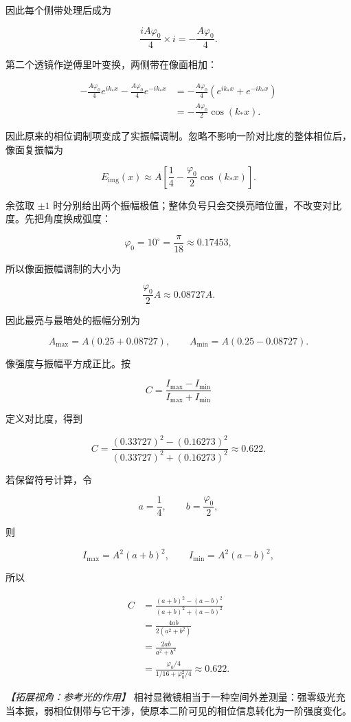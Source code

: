 \documentclass[12pt,a4paper,UTF8]{ctexart}
\begin{document}
因此每个侧带处理后成为

\[\frac{iA\varphi_0}{4}\times i
=-\frac{A\varphi_0}{4}.\]

第二个透镜作逆傅里叶变换，两侧带在像面相加：

\[\begin{aligned}
-\frac{A\varphi_0}{4}e^{ik_*x}
-\frac{A\varphi_0}{4}e^{-ik_*x}
&=-\frac{A\varphi_0}{4}
\left(e^{ik_*x}+e^{-ik_*x}\right)\\
&=-\frac{A\varphi_0}{2}\cos(k_*x).
\end{aligned}\]

因此原来的相位调制项变成了实振幅调制。忽略不影响一阶对比度的整体相位后，像面复振幅为

\[E_{\mathrm{img}}(x)
\approx A\left[\frac14-\frac{\varphi_0}{2}\cos(k_*x)\right].\]

余弦取 \(\pm1\)
时分别给出两个振幅极值；整体负号只会交换亮暗位置，不改变对比度。先把角度换成弧度：

\[\varphi_0=10^\circ=\frac\pi{18}\approx0.17453,\]

所以像面振幅调制的大小为

\[\frac{\varphi_0}{2}A\approx0.08727A.\]

因此最亮与最暗处的振幅分别为

\[A_{\max}=A(0.25+0.08727),\qquad
A_{\min}=A(0.25-0.08727).\]

像强度与振幅平方成正比。按

\[C=\frac{I_{\max}-I_{\min}}{I_{\max}+I_{\min}}\]

定义对比度，得到

\[C=
\frac{(0.33727)^2-(0.16273)^2}
{(0.33727)^2+(0.16273)^2}
\approx\boxed{0.622}.\]

若保留符号计算，令

\[a=\frac14,\qquad b=\frac{\varphi_0}{2},\]

则

\[I_{\max}=A^2(a+b)^2,\qquad
I_{\min}=A^2(a-b)^2,\]

所以

\[\begin{aligned}
C
&=\frac{(a+b)^2-(a-b)^2}{(a+b)^2+(a-b)^2}\\
&=\frac{4ab}{2(a^2+b^2)}\\
&=\frac{2ab}{a^2+b^2}\\
&=\frac{\varphi_0/4}{1/16+\varphi_0^2/4}
\approx0.622.
\end{aligned}\]

\emph{【拓展视角：参考光的作用】}
相衬显微镜相当于一种空间外差测量：强零级光充当本振，弱相位侧带与它干涉，使原本二阶可见的相位信息转化为一阶强度变化。
\end{document}
